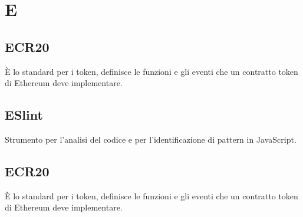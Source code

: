 \section*{E}
\subsection*{ECR20}
È lo standard per i token, definisce le funzioni e gli eventi che un contratto token di Ethereum deve implementare.

\subsection*{ESlint}
Strumento per l’analisi del codice e per l’identificazione di pattern in JavaScript.

\subsection*{ECR20}
È lo standard per i token, definisce le funzioni e gli eventi che un contratto token di Ethereum deve implementare.

